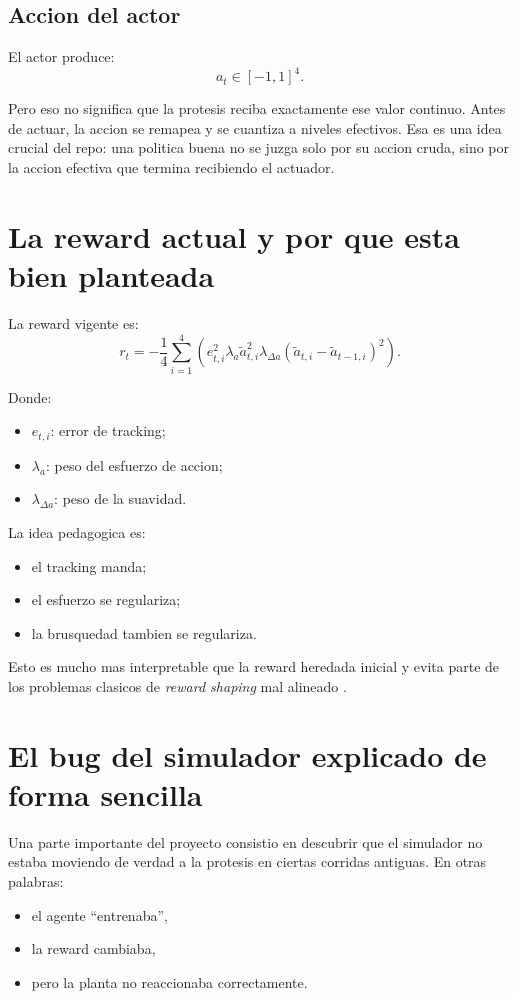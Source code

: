 \documentclass[11pt,a4paper]{article}
\begin{document}
\subsection{Accion del actor}

El actor produce:
\[
a_t \in [-1,1]^4.
\]

Pero eso no significa que la protesis reciba exactamente ese valor continuo. Antes de actuar, la accion se remapea y se cuantiza a niveles efectivos. Esa es una idea crucial del repo: una politica buena no se juzga solo por su accion cruda, sino por la accion efectiva que termina recibiendo el actuador.

\section{La reward actual y por que esta bien planteada}

La reward vigente es:
\[
r_t = -\frac{1}{4}\sum_{i=1}^{4}\left(
e_{t,i}^{2}
\lambda_a \tilde{a}_{t,i}^{2}
\lambda_{\Delta a}\left(\tilde{a}_{t,i}-\tilde{a}_{t-1,i}\right)^2
\right).
\]

Donde:
\begin{itemize}[leftmargin=1.5em]
\item \(e_{t,i}\): error de tracking;
\item \(\lambda_a\): peso del esfuerzo de accion;
\item \(\lambda_{\Delta a}\): peso de la suavidad.
\end{itemize}

La idea pedagogica es:
\begin{itemize}[leftmargin=1.5em]
\item el tracking manda;
\item el esfuerzo se regulariza;
\item la brusquedad tambien se regulariza.
\end{itemize}

Esto es mucho mas interpretable que la reward heredada inicial y evita parte de los problemas clasicos de \emph{reward shaping} mal alineado \citep{deng2025reward,lee2024smoothness}.

\section{El bug del simulador explicado de forma sencilla}

Una parte importante del proyecto consistio en descubrir que el simulador no estaba moviendo de verdad a la protesis en ciertas corridas antiguas. En otras palabras:
\begin{itemize}[leftmargin=1.5em]
\item el agente ``entrenaba'',
\item la reward cambiaba,
\item pero la planta no reaccionaba correctamente.
\end{itemize}
\end{document}
